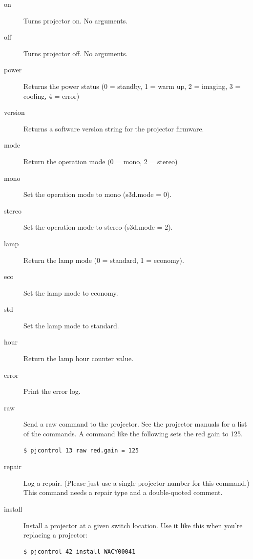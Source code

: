 \documentclass[11pt]{article}
\begin{document}
\begin{description}
\item[on] Turns projector on.  No arguments.

\item[off] Turns projector off.  No arguments.

\item[power] Returns the power status (0 = standby, 1 = warm up, 2 = imaging,
3 = cooling, 4 = error)

\item[version] Returns a software version string for the projector firmware.

\item[mode] Return the operation mode (0 = mono, 2 = stereo)

\item[mono] Set the operation mode to mono (s3d.mode = 0).

\item[stereo] Set the operation mode to stereo (s3d.mode = 2).

\item[lamp] Return the lamp mode (0 = standard, 1 = economy).

\item[eco] Set the lamp mode to economy.

\item[std] Set the lamp mode to standard.

\item[hour] Return the lamp hour counter value.

\item[error] Print the error log.

\item[raw] Send a raw command to the projector.  See the projector
  manuals for a list of the commands.  A command like the following
  sets the red gain to 125.

\begin{verbatim}
$ pjcontrol 13 raw red.gain = 125
\end{verbatim}
  
\item[repair] Log a repair.  (Please just use a single projector
  number for this command.)  This command needs a repair type and a
  double-quoted comment.

\item[install] Install a projector at a given switch location.  Use it
  like this when you're replacing a projector:

\begin{verbatim}
$ pjcontrol 42 install WACY00041
\end{verbatim}
  

\end{description}
\end{document}
